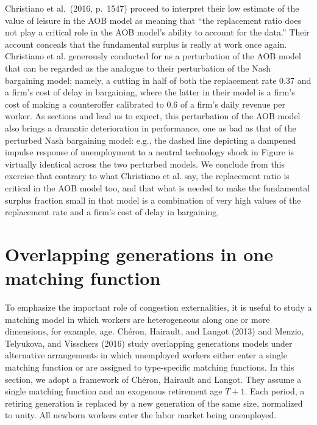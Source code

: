Christiano et al.\ (2016, p.~1547) proceed to interpret  their low estimate of the value of leisure in the
AOB model as meaning that ``the replacement ratio does not play a critical role
in the AOB model's ability to account for the data.''
Their account conceals that the fundamental surplus  is really at work once
again. Christiano et al.
 generously conducted for us
a perturbation of the AOB model that can be regarded as the
analogue to their perturbation of the Nash bargaining model;
namely, a cutting in half
of both the replacement rate 0.37 and a firm's cost of delay
in bargaining, where the latter in their model is a firm's
cost of  making a counteroffer  calibrated to 0.6 of a firm's
daily revenue per worker.
As  sections
 and  lead us to expect, this
perturbation of the AOB model also brings a dramatic
deterioration in performance, one as bad as that of the perturbed Nash
bargaining model: e.g., the dashed line depicting a
dampened impulse response of unemployment to a neutral
technology shock in Figure  
is virtually identical across the two perturbed models.
We conclude from this exercise that contrary to what Christiano et al. say,  the replacement ratio is  critical
in the AOB model too, and that  what is needed to make the fundamental surplus fraction small
in that model
is a combination of very high
values of the replacement rate and a firm's cost of delay in
bargaining.








  
\section{Overlapping generations in one matching function}\label{sec:M_OLG1}%
  To emphasize the important role of  congestion externalities, it
  is useful to study a matching model in which workers are heterogeneous along one or more
  dimensions, for example, age.
 Ch\'eron,
Hairault, and Langot (2013) and Menzio, Telyukova, and Visschers (2016)
study overlapping generations  models under alternative arrangements in which unemployed
workers either enter a single matching function or are assigned to type-specific
matching functions. In this section,
we adopt a framework of Ch\'eron, Hairault
and Langot. They  assume a single matching function and an exogenous retirement
age $T+1$. Each period, a retiring generation is replaced by a new generation of the same
size, normalized to unity.  All newborn workers enter the labor market being
unemployed.



